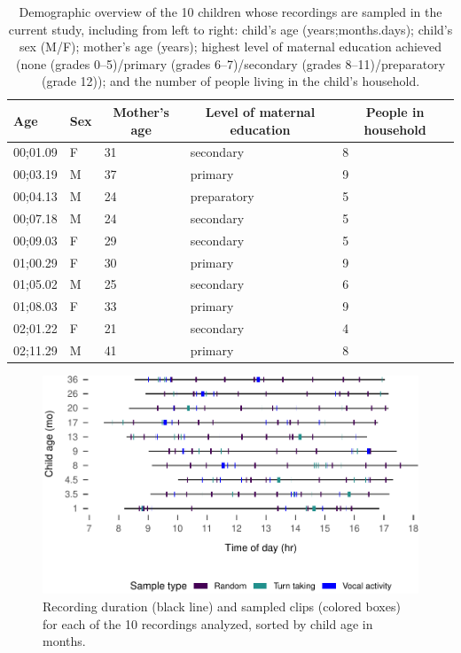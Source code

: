 \documentclass[,man,floatsintext]{apa6}
\begin{document}
\begin{table}[tbp]
\begin{center}
\begin{threeparttable}
\caption{\label{tab:tab1}Demographic overview of the 10 children whose recordings are sampled in the current study, including from left to right: child's age (years;months.days); child's sex (M/F); mother's age (years); highest level of maternal education achieved (none (grades 0--5)/primary (grades 6--7)/secondary (grades 8--11)/preparatory (grade 12)); and the number of people living in the child's household.}
\begin{tabular}{lllll}
\toprule
Age & \multicolumn{1}{c}{Sex} & \multicolumn{1}{c}{Mother's age} & \multicolumn{1}{c}{Level of maternal education} & \multicolumn{1}{c}{People in household}\\
\midrule
00;01.09 & F & 31 & secondary & 8\\
00;03.19 & M & 37 & primary & 9\\
00;04.13 & M & 24 & preparatory & 5\\
00;07.18 & M & 24 & secondary & 5\\
00;09.03 & F & 29 & secondary & 5\\
01;00.29 & F & 30 & primary & 9\\
01;05.02 & M & 25 & secondary & 6\\
01;08.03 & F & 33 & primary & 9\\
02;01.22 & F & 21 & secondary & 4\\
02;11.29 & M & 41 & primary & 8\\
\bottomrule
\end{tabular}
\end{threeparttable}
\end{center}
\end{table}

\begin{figure}
\centering
\includegraphics{Yeli-CLE_files/figure-latex/fig1-1.pdf}
\caption{\label{fig:fig1}Recording duration (black line) and sampled clips
(colored boxes) for each of the 10 recordings analyzed, sorted by child
age in months.}
\end{figure}
\end{document}
